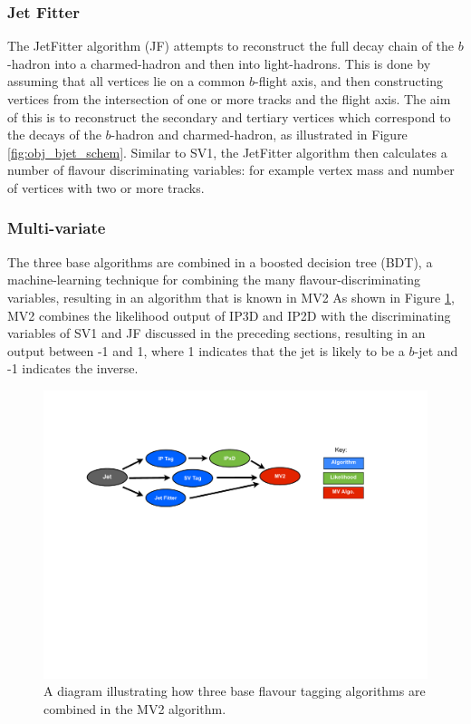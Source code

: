 \subsubsection{Jet Fitter}
\label{sec:obj-bjets_JF}

The JetFitter algorithm (JF) attempts to reconstruct the full decay chain of the $b$-hadron into a charmed-hadron and then into light-hadrons. 
This is done by assuming that all vertices lie on a common $b$-flight axis, and then constructing vertices from the intersection of
one or more tracks and the flight axis.
The aim of this is to reconstruct the secondary and tertiary vertices which correspond to the decays of the $b$-hadron and charmed-hadron,
as illustrated in Figure \ref{fig:obj_bjet_schem}.
Similar to SV1, the JetFitter algorithm then calculates a number of flavour discriminating variables:
for example vertex mass and number of vertices with two or more tracks.

\subsubsection{Multi-variate}
\label{sec:obj-bjets_MV2}

The three base algorithms are combined in a boosted decision tree (BDT), a machine-learning technique for combining the many flavour-discriminating variables,
resulting in an algorithm that is known in MV2
As shown in Figure \ref{fig:obj-MV2_schem}, MV2 combines the likelihood output of IP3D and IP2D
with the discriminating variables of SV1 and JF discussed in the preceding sections,
resulting in an output between -1 and 1, where 1 indicates that the jet is likely to be a $b$-jet and -1 indicates the inverse.

\begin{figure}[!htb]
  \begin{center}
    \includegraphics[width=1.0\textwidth]{figs/Objects/MV2_schem.pdf}
    \caption{A diagram illustrating how three base flavour tagging algorithms are combined in the MV2 algorithm.}
    \label{fig:obj-MV2_schem}
  \end{center}
  \vspace{-1cm}
\end{figure}

